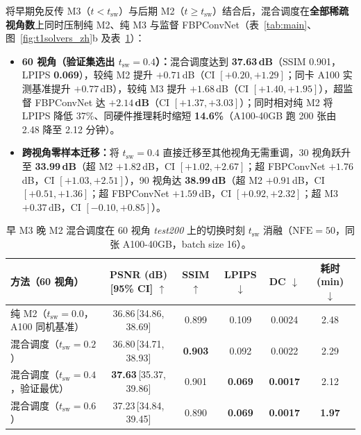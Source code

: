 \documentclass[11pt,UTF8]{ctexart}
\begin{document}
将早期免反传 M3（$t{<}t_{\mathrm{sw}}$）与后期 M2（$t{\ge}t_{\mathrm{sw}}$）结合后，混合调度在\textbf{全部稀疏视角数}上同时压制纯 M2、纯 M3 与监督 FBPConvNet（表~\ref{tab:main}、图~\ref{fig:t1solvers_zh}b 及表~\ref{tab:hybrid_zh}）：
\begin{itemize}[leftmargin=*,nosep]
  \item \textbf{60 视角（验证集选出 $t_{\mathrm{sw}}{=}0.4$）：}混合调度达到 \textbf{37.63\,dB}（SSIM 0.901，LPIPS \textbf{0.069}），较纯 M2 提升 $+0.71$\,dB（CI $[+0.20,+1.29]$；同卡 A100 实测基准提升 $+0.77$\,dB），较纯 M3 提升 $+1.68$\,dB（CI $[+1.40,+1.95]$），超监督 FBPConvNet 达 \textbf{$+2.14$\,dB}（CI $[+1.37,+3.03]$）；同时相对纯 M2 将 LPIPS 降低 37\%、同硬件推理耗时缩短 \textbf{14.6\%}（A100-40GB 跑 200 张由 2.48 降至 2.12 分钟）。
  \item \textbf{跨视角零样本迁移：}将 $t_{\mathrm{sw}}{=}0.4$ 直接迁移至其他视角无需重调，30 视角跃升至 \textbf{33.99\,dB}（超 M2 $+1.82$\,dB，CI $[+1.02,+2.67]$；超 FBPConvNet $+1.76$\,dB，CI $[+1.03,+2.51]$），90 视角达 \textbf{38.99\,dB}（超 M2 $+0.91$\,dB，CI $[+0.51,+1.36]$；超 FBPConvNet $+1.59$\,dB，CI $[+0.92,+2.32]$；超 M3 $+0.37$\,dB，CI $[-0.10,+0.85]$）。
\end{itemize}

\begin{table}[t]
\centering
\caption{早 M3 晚 M2 混合调度在 60 视角 \emph{test200} 上的切换时刻 $t_{\mathrm{sw}}$ 消融（$\mathrm{NFE}{=}50$，同张 A100-40GB，batch size 16）。}
\label{tab:hybrid_zh}
\small
\begin{tabular}{lccccc}
\toprule
方法（60 视角） & PSNR (dB) [95\% CI] $\uparrow$ & SSIM $\uparrow$ & LPIPS $\downarrow$ & DC $\downarrow$ & 耗时 (min) $\downarrow$ \\
\midrule
纯 M2（$t_{\mathrm{sw}}{=}0.0$，A100 同机基准） & 36.86\,{\scriptsize[34.86, 38.69]} & 0.899 & 0.109 & 0.0024 & 2.48 \\
混合调度（$t_{\mathrm{sw}}{=}0.2$） & 36.80\,{\scriptsize[34.71, 38.93]} & \textbf{0.903} & 0.092 & 0.0022 & 2.29 \\
混合调度（$t_{\mathrm{sw}}{=}0.4$，验证最优） & \textbf{37.63}\,{\scriptsize[35.37, 39.86]} & 0.901 & \textbf{0.069} & \textbf{0.0017} & 2.12 \\
混合调度（$t_{\mathrm{sw}}{=}0.6$） & 37.23\,{\scriptsize[34.84, 39.45]} & 0.890 & \textbf{0.069} & \textbf{0.0017} & \textbf{1.97} \\
\bottomrule
\end{tabular}
\end{table}
\end{document}
